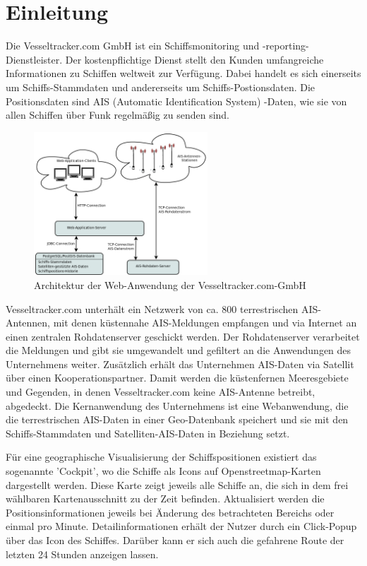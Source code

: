 \chapter{Einleitung}

Die Vesseltracker.com GmbH ist ein Schiffsmonitoring und -reporting-Dienstleister. Der kostenpflichtige Dienst stellt den Kunden umfangreiche Informationen zu Schiffen weltweit zur Verfügung. Dabei handelt es sich einerseits um Schiffs-Stammdaten und andererseits um Schiffs-Postionsdaten. Die Positionsdaten sind AIS (Automatic Identification System) -Daten, wie sie von allen Schiffen über Funk regelmäßig zu senden sind.

\begin{figure}
  \begin{center}
    \includegraphics[width=0.58\textwidth]{images/Exposee_graphik_Webapp}
  \end{center}
  \caption{Architektur der Web-Anwendung der Vesseltracker.com-GmbH}
\end{figure}

Vesseltracker.com unterhält ein Netzwerk von ca. 800 terrestrischen AIS-Antennen, mit denen küstennahe AIS-Meldungen empfangen und via Internet an einen zentralen Rohdatenserver geschickt werden. Der Rohdatenserver verarbeitet die Meldungen und gibt sie umgewandelt und gefiltert an die Anwendungen des Unternehmens weiter.
Zusätzlich erhält das Unternehmen AIS-Daten via Satellit über einen Kooperationspartner. Damit werden die küstenfernen Meeresgebiete und Gegenden, in denen Vesseltracker.com keine AIS-Antenne betreibt, abgedeckt.
Die Kernanwendung des Unternehmens ist eine Webanwendung, die die terrestrischen AIS-Daten in einer Geo-Datenbank speichert und sie mit den Schiffs-Stammdaten und Satelliten-AIS-Daten in Beziehung setzt.

Für eine geographische Visualisierung der Schiffspositionen existiert das sogenannte 'Cockpit', wo die Schiffe als Icons auf Openstreetmap-Karten dargestellt werden. Diese Karte zeigt jeweils alle Schiffe an, die sich in dem frei wählbaren Kartenausschnitt zu der Zeit befinden. Aktualisiert werden die Positionsinformationen jeweils bei Änderung des betrachteten Bereichs oder einmal pro Minute. Detailinformationen erhält der Nutzer durch ein Click-Popup über das Icon des Schiffes. Darüber kann er sich auch die gefahrene Route der letzten 24 Stunden anzeigen lassen.


